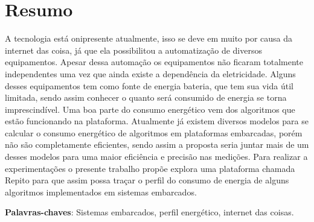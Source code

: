 \chapter*{Resumo}

\noindent A tecnologia está onipresente atualmente, isso se deve em muito por causa da internet
das coisa, já que  ela possibilitou a automatização de diversos equipamentos. Apesar dessa automação os equipamentos não ficaram totalmente independentes uma vez que ainda existe a dependência da eletricidade. Alguns desses equipamentos tem como fonte de energia bateria, que tem sua vida útil limitada, sendo assim conhecer o quanto será consumido de energia se torna imprescindível. Uma boa parte do consumo energético vem dos algoritmos que estão funcionando na plataforma. Atualmente já existem diversos modelos para se calcular o consumo energético de algoritmos em plataformas embarcadas, porém não são completamente eficientes, sendo assim a proposta seria juntar mais de um desses modelos para uma maior eficiência e precisão nas medições. Para realizar a experimentações o presente trabalho propõe explora uma plataforma chamada Repito
para que assim possa traçar o perfil do consumo de energia de alguns algoritmos
implementados em sistemas embarcados.



\textbf{Palavras-chaves}: Sistemas embarcados, perfil energético, internet das coisas.
